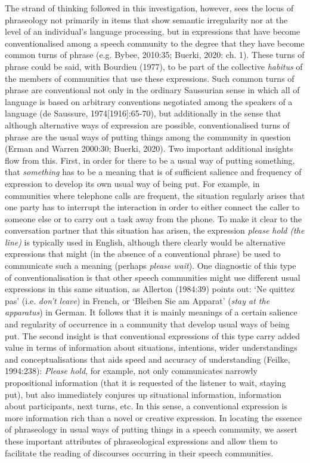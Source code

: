 \documentclass[12pt]{article}
\newenvironment{styleStandard}{\setlength\leftskip{0cm}\setlength\rightskip{0cm plus 1fil}\setlength\parindent{0cm}\setlength\parfillskip{0pt plus 1fil}\setlength\parskip{0in plus 1pt}\writerlistparindent\writerlistleftskip\leavevmode\normalfont\normalsize\writerlistlabel\ignorespaces}{\unskip\vspace{0.111in plus 0.0111in}\par}
\newcommand\writerlistleftskip{}
\newcommand\writerlistparindent{}
\newcommand\writerlistlabel{}
\begin{document}
\begin{styleStandard}
The strand of thinking followed in this investigation, however, sees the locus of phraseology not primarily in items that show semantic irregularity nor at the level of an individual’s language processing, but in expressions that have become conventionalised among a speech community to the degree that they have become common turns of phrase (e.g. Bybee, 2010:35; Buerki, 2020: ch. 1). These turns of phrase could be said, with Bourdieu (1977), to be part of the collective \textit{habitus} of the members of communities that use these expressions. Such common turns of phrase are conventional not only in the ordinary Saussurian sense in which all of language is based on arbitrary conventions negotiated among the speakers of a language (de Saussure, 1974[1916]:65-70), but additionally in the sense that although alternative ways of expression are possible, conventionalised turns of phrase are the usual ways of putting things among the community in question (Erman and Warren 2000:30; Buerki, 2020). Two important additional insights flow from this. First, in order for there to be a usual way of putting something, that \textit{something} has to be a meaning that is of sufficient salience and frequency of expression to develop its own usual way of being put. For example, in communities where telephone calls are frequent, the situation regularly arises that one party has to interrupt the interaction in order to either connect the caller to someone else or to carry out a task away from the phone. To make it clear to the conversation partner that this situation has arisen, the expression \textit{please hold (the line)} is typically used in English, although there clearly would be alternative expressions that might (in the absence of a conventional phrase) be used to communicate such a meaning (perhaps \textit{please wait}). One diagnostic of this type of conventionalisation is that other speech communities might use different usual expressions in this same situation, as Allerton (1984:39) points out: ‘Ne quittez pas’ (i.e. \textit{don’t leave}) in French, or ‘Bleiben Sie am Apparat’ (\textit{stay at the apparatus}) in German. It follows that it is mainly meanings of a certain salience and regularity of occurrence in a community that develop usual ways of being put. The second insight is that conventional expressions of this type carry added value in terms of information about situations, intentions, wider understandings and conceptualisations that aids speed and accuracy of understanding (Feilke, 1994:238): \textit{Please hold}, for example, not only communicates narrowly propositional information (that it is requested of the listener to wait, staying put), but also immediately conjures up situational information, information about participants, next turns, etc. In this sense, a conventional expression is more information rich than a novel or creative expression. In locating the essence of phraseology in usual ways of putting things in a speech community, we assert these important attributes of phraseological expressions and allow them to facilitate the reading of discourses occurring in their speech communities.
\end{styleStandard}
\end{document}
